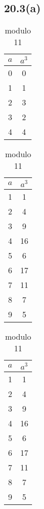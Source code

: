 \subsection{20.3(a)}

\begin{table}[H]
\centering
\begin{subtable}{.24\linewidth}
	\centering
	\begin{tabular}{c|c}
		$a$ & $a^3$ \\ \hline
		0 & 0 \\
		1 & 1 \\
		2 & 3 \\
		3 & 2 \\
		4 & 4 \\
	\end{tabular}
	\caption*{modulo 5}
\end{subtable}
\begin{subtable}{.24\linewidth}
	\centering
	\begin{tabular}{c|c}
		$a$ & $a^3$ \\ \hline
		1   & 1  \\
		2   & 4  \\
		3   & 9  \\
		4   & 16 \\
		5   & 6  \\
		6   & 17 \\
		7   & 11 \\
		8   & 7  \\
		9   & 5
	\end{tabular}
	\caption*{modulo 7}
\end{subtable}
\begin{subtable}{.24\linewidth}
	\centering
	\begin{tabular}{c|c}
		$a$ & $a^3$ \\ \hline
		1   & 1  \\
		2   & 4  \\
		3   & 9  \\
		4   & 16 \\
		5   & 6  \\
		6   & 17 \\
		7   & 11 \\
		8   & 7  \\
		9   & 5
	\end{tabular}
	\caption*{modulo 11}
\end{subtable}

\end{table}
